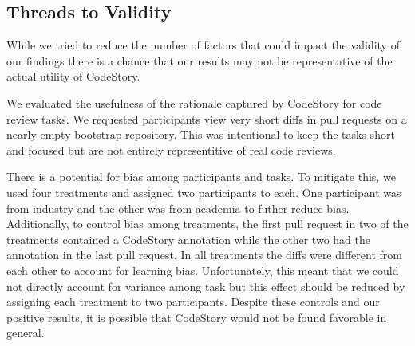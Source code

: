 \documentclass[../manifest.tex]{subfiles}
\begin{document}
\subsection{Threads to Validity} \label{eval-threats}
While we tried to reduce the number of factors that could impact the validity of our findings there is a chance that our results may not be representative of the actual utility of CodeStory.

We evaluated the usefulness of the rationale captured by CodeStory for code review tasks. We requested participants view very short diffs in pull requests on a nearly empty bootstrap repository. This was intentional to keep the tasks short and focused but are not entirely representitive of real code reviews.

There is a potential for bias among participants and tasks. To mitigate this, we used four treatments and assigned two participants to each. One participant was from industry and the other was from academia to futher reduce bias. Additionally, to control bias among treatments, the first pull request in two of the treatments contained a CodeStory annotation while the other two had the annotation in the last pull request. In all treatments the diffs were different from each other to account for learning bias. Unfortunately, this meant that we could not directly account for variance among task but this effect should be reduced by assigning each treatment to two participants. Despite these controls and our positive results, it is possible that CodeStory would not be found favorable in general.



\end{document}
